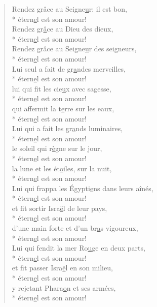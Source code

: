 \begin{verse}
Rendez grâce au Seigne\underline{u}r: il est bon, \\*
étern\underline{e}l est son amour! \\
Rendez gr\underline{â}ce au Dieu des dieux, \\*
étern\underline{e}l est son amour! \\
Rendez grâce au Seigne\underline{u}r des seigneurs, \\*
étern\underline{e}l est son amour! \\

Lui seul a fait de gr\underline{a}ndes merveilles, \\*
étern\underline{e}l est son amour! \\
lui qui fit les cie\underline{u}x avec sagesse, \\*
étern\underline{e}l est son amour! \\
qui affermit la t\underline{e}rre sur les eaux, \\*
étern\underline{e}l est son amour! \\

Lui qui a fait les gr\underline{a}nds luminaires, \\*
étern\underline{e}l est son amour! \\
le soleil qui r\underline{è}gne sur le jour, \\*
étern\underline{e}l est son amour! \\
la lune et les ét\underline{o}iles, sur la nuit, \\*
étern\underline{e}l est son amour! \\

Lui qui frappa les Égypti\underline{e}ns dans leurs aînés, \\*
étern\underline{e}l est son amour! \\
et fit sortir Isra\underline{ë}l de leur pays, \\*
étern\underline{e}l est son amour! \\
d’une main forte et d’un br\underline{a}s vigoureux, \\*
étern\underline{e}l est son amour! \\

Lui qui fendit la mer Ro\underline{u}ge en deux parts, \\*
étern\underline{e}l est son amour! \\
et fit passer Isra\underline{ë}l en son milieu, \\*
étern\underline{e}l est son amour! \\
y rejetant Phara\underline{o}n et ses armées, \\*
étern\underline{e}l est son amour! \\


\end{verse}
